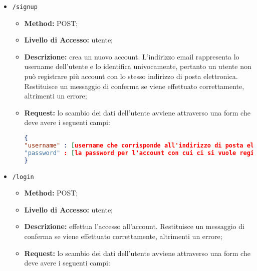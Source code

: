 \begin{itemize}
\item \texttt{/signup}
\begin{itemize}
\item \textbf{Method:} POST;
\item \textbf{Livello di Accesso:} utente;
\item \textbf{Descrizione:} crea un nuovo account. L'indirizzo email rappresenta lo username dell'utente e lo identifica univocamente, pertanto un utente non può registrare più account con lo stesso indirizzo di posta elettronica. Restituisce un messaggio di conferma se viene effettuato correttamente, altrimenti un errore;
\item \textbf{Request:} lo scambio dei dati dell'utente avviene attraverso una form che deve avere i seguenti campi:
\begin{lstlisting}[language=json,firstnumber=1]
{
"username" : [username che corrisponde all'indirizzo di posta elettronica con cui ci si vuole registrare];
"password" : [la password per l'account con cui ci si vuole registrare].
}
\end{lstlisting}
\end{itemize}
\item \texttt{/login}
\begin{itemize}
\item \textbf{Method:} POST;
\item \textbf{Livello di Accesso:} utente;
\item \textbf{Descrizione:} effettua l'accesso all'account. Restituisce un messaggio di conferma se viene effettuato correttamente, altrimenti un errore;
\item \textbf{Request:}  lo scambio dei dati dell'utente avviene attraverso una form che deve avere i seguenti campi:
\begin{lstlisting}[language=json,firstnumber=1]

\end{lstlisting}
\end{itemize}
\end{itemize}
